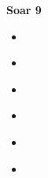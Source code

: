 \documentclass{beamer}
\begin{document}
%
%

\begin{frame}{}
\begin{center}
	\textbf{Soar 9}
\end{center}
\end{frame}

\begin{frame}{}
\begin{itemize}
	\item 
	\medskip
\end{itemize}
\end{frame}

\begin{frame}{}
\begin{itemize}
	\item 
	\medskip
\end{itemize}
\end{frame}

\begin{frame}{}
\begin{itemize}
	\item 
	\medskip
\end{itemize}
\end{frame}

\begin{frame}{}
\begin{itemize}
	\item 
	\medskip
\end{itemize}
\end{frame}

\begin{frame}{}
\begin{itemize}
	\item 
	\medskip
\end{itemize}
\end{frame}

\begin{frame}{}
\begin{itemize}
	\item 
	\medskip
\end{itemize}
\end{frame}
\end{document}
